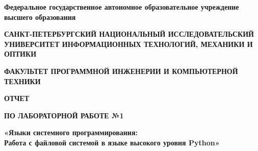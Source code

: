 \documentclass[12pt]{article}
\begin{document}
\setlength{\parindent}{0pt}
\pagestyle{empty}
\begin{center}
\normalsize
\textbf{Федеральное государственное автономное образовательное учреждение высшего образования}

\small
\medskip 
\textbf{САНКТ-ПЕТЕРБУРГСКИЙ НАЦИОНАЛЬНЫЙ ИССЛЕДОВАТЕЛЬСКИЙ  УНИВЕРСИТЕТ ИНФОРМАЦИОННЫХ ТЕХНОЛОГИЙ, МЕХАНИКИ И ОПТИКИ}

\medskip 
\textbf{ФАКУЛЬТЕТ ПРОГРАММНОЙ ИНЖЕНЕРИИ И КОМПЬЮТЕРНОЙ ТЕХНИКИ}
\end{center}
\bigskip\bigskip\bigskip\bigskip\bigskip\bigskip\bigskip\bigskip\bigskip\bigskip\bigskip\bigskip
\begin{center}
\par\medskip\par\smallskip
\Large
 
\par\smallskip
\textbf{ОТЧЕТ} 

\textbf{ПО ЛАБОРАТОРНОЙ РАБОТЕ №1}

\large
\par\bigskip
\textbf{«Языки системного программирования: \\ Работа с файловой системой в языке высокого уровня Python»}
\par\bigskip\par\bigskip\par\bigskip\par\bigskip\par\bigskip\par\bigskip
\par\bigskip\par\bigskip\par\bigskip\par\bigskip\par\bigskip\par\bigskip
\par\bigskip\par\bigskip\par\bigskip\par\bigskip\par\bigskip\par\bigskip
\end{center}
\end{document}
